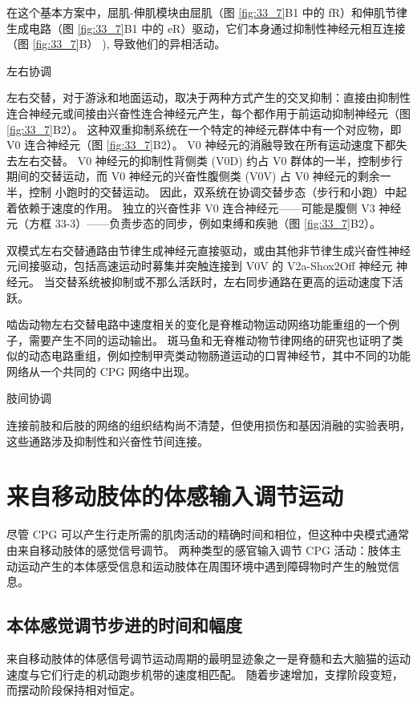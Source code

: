 在这个基本方案中，屈肌-伸肌模块由屈肌（图 \ref{fig:33_7}B1 中的 fR）和伸肌节律生成电路（图 \ref{fig:33_7}B1 中的 eR）驱动，它们本身通过抑制性神经元相互连接（图 \ref{fig:33_7}B） ), 导致他们的异相活动。

左右协调

左右交替，对于游泳和地面运动，取决于两种方式产生的交叉抑制：直接由抑制性连合神经元或间接由兴奋性连合神经元产生，每个都作用于前运动抑制神经元（图 \ref{fig:33_7}B2）。 这种双重抑制系统在一个特定的神经元群体中有一个对应物，即 V0 连合神经元（图 \ref{fig:33_7}B2）。 V0 神经元的消融导致在所有运动速度下都失去左右交替。 V0 神经元的抑制性背侧类 (V0D) 约占 V0 群体的一半，控制步行期间的交替运动，而 V0 神经元的兴奋性腹侧类 (V0V) 占 V0 神经元的剩余一半，控制 小跑时的交替运动。 因此，双系统在协调交替步态（步行和小跑）中起着依赖于速度的作用。 独立的兴奋性非 V0 连合神经元——可能是腹侧 V3 神经元（方框 33-3）——负责步态的同步，例如束缚和疾驰（图 \ref{fig:33_7}B2）。

双模式左右交替通路由节律生成神经元直接驱动，或由其他非节律生成兴奋性神经元间接驱动，包括高速运动时募集并突触连接到 V0V 的 V2a-Shox2Off 神经元 神经元。 当交替系统被抑制或不那么活跃时，左右同步通路在更高的运动速度下活跃。

啮齿动物左右交替电路中速度相关的变化是脊椎动物运动网络功能重组的一个例子，需要产生不同的运动输出。 斑马鱼和无脊椎动物节律网络的研究也证明了类似的动态电路重组，例如控制甲壳类动物肠道运动的口胃神经节，其中不同的功能网络从一个共同的 CPG 网络中出现。

肢间协调

连接前肢和后肢的网络的组织结构尚不清楚，但使用损伤和基因消融的实验表明，这些通路涉及抑制性和兴奋性节间连接。

\section{来自移动肢体的体感输入调节运动}
尽管 CPG 可以产生行走所需的肌肉活动的精确时间和相位，但这种中央模式通常由来自移动肢体的感觉信号调节。 两种类型的感官输入调节 CPG 活动：肢体主动运动产生的本体感受信息和运动肢体在周围环境中遇到障碍物时产生的触觉信息。

\subsection{本体感觉调节步进的时间和幅度}
来自移动肢体的体感信号调节运动周期的最明显迹象之一是脊髓和去大脑猫的运动速度与它们行走的机动跑步机带的速度相匹配。 随着步速增加，支撑阶段变短，而摆动阶段保持相对恒定。

